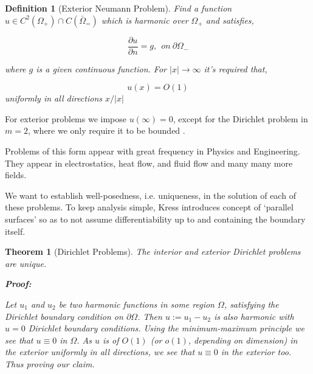 \documentclass[12pt, a4, twoside]{article}
\newtheorem{theorem}{Theorem}[section]
\newtheorem{definition}{Definition}[section]
\begin{document}
\begin{definition}[Exterior Neumann Problem]
    \label{def:ext_neu_prob}
    Find a function $u \in C^2(\Omega_+) \cap C(\bar{\Omega}_=)$ which is harmonic over $\Omega_+$ and satisfies,

    $$ \frac{\partial u}{\partial n} = g, \> \> on \>  \partial \Omega_- $$ 

    where $g$ is a given continuous function. For $|x| \rightarrow \infty$ it's required that,

    $$u(x) = O(1)$$ uniformly in all directions $x/|x|$
\end{definition}

For exterior problems we impose $u(\infty) = 0$, except for the Dirichlet problem in $m=2$, where we only require it to be bounded \cite*[]{kress2012}.


Problems of this form appear with great frequency in Physics and Engineering. They appear in electrostatics, heat flow, and fluid flow and many many more fields.

We want to establish well-posedness, i.e. uniqueness, in the solution of each of these problems. To keep analysis simple, Kress \cite*[]{kress2012} introduces concept of `parallel surfaces' so as to not assume differentiability up to and containing the boundary itself.

\begin{theorem}[Dirichlet Problems]
    The interior and exterior Dirichlet problems are unique.

    \textbf{Proof:}

    Let $u_1$ and $u_2$ be two harmonic functions in some region $\Omega$, satisfying the Dirichlet boundary condition on $\partial \Omega$. Then $u := u_1 - u_2$ is also harmonic with $u = 0$ Dirichlet boundary conditions. Using the minimum-maximum principle we see that $u \equiv 0$ in $\Omega$. As $u$ is of $O(1)$ (or $o(1)$, depending on dimension) in the exterior uniformly in all directions, we see that $u \equiv 0$ in the exterior too. Thus proving our claim.
\end{theorem}
\end{document}
